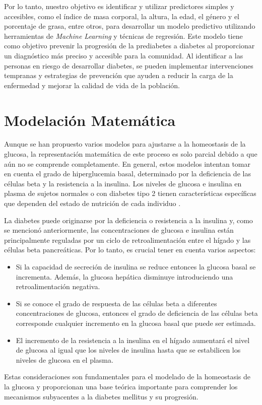Por lo tanto, nuestro objetivo es identificar y utilizar predictores simples y accesibles, como el índice de masa corporal, la altura, la edad, el género y el porcentaje de grasa, entre otros, para desarrollar un modelo predictivo utilizando herramientas de \textit{Machine Learning} y técnicas de regresión. Este modelo tiene como objetivo prevenir la progresión de la prediabetes a diabetes al proporcionar un diagnóstico más preciso y accesible para la comunidad. Al identificar a las personas en riesgo de desarrollar diabetes, se pueden implementar intervenciones tempranas y estrategias de prevención que ayuden a reducir la carga de la enfermedad y mejorar la calidad de vida de la población.


\section{Modelación Matemática}

Aunque se han propuesto varios modelos para ajustarse a la homeostasis de la glucosa, la representación matemática de este proceso es solo parcial debido a que aún no se comprende completamente. En general, estos modelos intentan tomar en cuenta el grado de hiperglucemia basal, determinado por la deficiencia de las células beta y la resistencia a la insulina. Los niveles de glucosa e insulina en plasma de sujetos normales o con diabetes tipo 2 tienen características específicas que dependen del estado de nutrición de cada individuo \cite{ModelacionMatematica2020}.

La diabetes puede originarse por la deficiencia o resistencia a la insulina y, como se mencionó anteriormente, las concentraciones de glucosa e insulina están principalmente reguladas por un ciclo de retroalimentación entre el hígado y las células beta pancreáticas. Por lo tanto, es crucial tener en cuenta varios aspectos:

\begin{itemize}
    \item Si la capacidad de secreción de insulina se reduce entonces la glucosa basal se incrementa. Además, la glucosa hepática disminuye introduciendo una retroalimentación negativa. 

    \item Si se conoce el grado de respuesta de las células beta a diferentes concentraciones de glucosa, entonces el grado de deficiencia de las células beta corresponde cualquier incremento en la glucosa basal que puede ser estimada.

    \item El incremento de la resistencia a la insulina en el hígado aumentará el nivel de glucosa al igual que los niveles de insulina hasta que se estabilicen los niveles de glucosa en el plasma.
\end{itemize}

Estas consideraciones son fundamentales para el modelado de la homeostasis de la glucosa y proporcionan una base teórica importante para comprender los mecanismos subyacentes a la diabetes mellitus y su progresión. \cite{InsulinDef}
